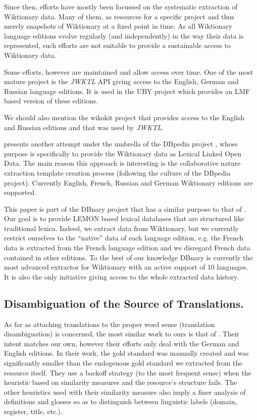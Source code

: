 \documentclass[10pt, a4paper]{article}
\begin{document}
Since then, efforts have mostly been focussed on the systematic extraction of Wiktionary data. Many of them, as resources for a specific project and thus merely snapshots of Wiktionary at a fixed point in time. As all Wiktionary language editions evolve regularly (and independently) in the way their data is represented, such efforts are not suitable to provide a sustainable access to Wiktionary data. 

Some efforts, however are maintained and allow access over time. One of the most mature project is the \emph{JWKTL} API \cite{ZeschMuellerGurevych2008} giving access to  the English, German and Russian language editions. It is used in the UBY project \cite{gurevych2012uby} which provides an LMF based version of these editions. 

We should also mention the wikokit project \cite{krizhanovsky2010transformation} that provides access to the English and Russian editions and that was used by \emph{JWKTL}.

\cite{HellmannSebastianandBrekleJonasandAuer} presents another attempt under the umbrella of the DBpedia project \cite{dbpedia-swj}, whose purpose is specifically to provide the Wiktionary data as Lexical Linked Open Data. The main reason this approach is interesting is the collaborative nature extraction template creation process (following the culture of the DBpedia project). Currently English, French, Russian and German Wiktionary editions are supported.

This paper is part of the DBnary project \cite{serasset:dbnary-swj} that has a similar purpose to that of \cite{HellmannSebastianandBrekleJonasandAuer}. Our goal is to provide LEMON \cite{McCrae2012} based lexical databases that are structured like traditional lexica. Indeed, we extract data from Wiktionary, but we currently restrict ourselves to the ``native'' data of each language edition, e.g. the French data is extracted from the French language edition and we disregard French data contained in other editions. To the best of our knowledge DBnary is currently the most advanced extractor for Wiktionary with an active support of 10 languages. It is also the only initiative giving access to the whole extracted data history.

\subsection{Disambiguation of the Source of Translations.} 

As far as attaching translations to the proper word sense (translation disambiguation) is concerned, the most similar work to ours is that of \cite{meyer-gurevych:2012:PAPERS}. Their intent matches our own, however their efforts only deal with the German and English editions. In their work, the gold standard was manually created and was significantly smaller than the endogenous gold standard we extracted from the resource itself. They use a backoff strategy (to the most frequent sense) when the heuristic based on similarity measures and the resource's structure fails. The other heuristics used with their similarity measure also imply a finer analysis of definitions and glosses so as to distinguish between linguistic labels (domain, register, title, etc.).
\end{document}
